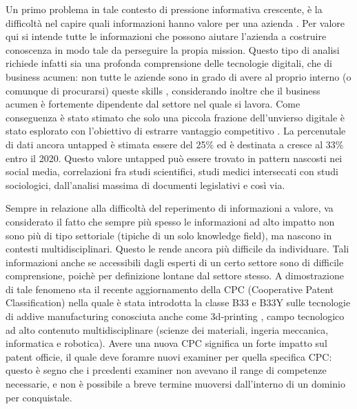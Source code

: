 \documentclass[]{book}
\begin{document}
Un primo problema in tale contesto di pressione informativa crescente, è
la difficoltà nel capire quali informazioni hanno valore per una azienda
\citep[\citet{chemchem2015data},\citet{kasemsap2015role}]{larose2014discovering}
. Per valore qui si intende tutte le informazioni che possono aiutare
l'azienda a costruire conoscenza in modo tale da perseguire la propia
mission. Questo tipo di analisi richiede infatti sia una profonda
comprensione delle tecnologie digitali, che di business acumen: non
tutte le aziende sono in grado di avere al proprio interno (o comunque
di procurarsi) queste skills \citep[\citet{davenport2012data},
\citet{provost2013data}, \citet{van2014data}]{hecklau2016holistic},
considerando inoltre che il business acumen è fortemente dipendente dal
settore nel quale si lavora. Come conseguenza è stato stimato che solo
una piccola frazione dell'unvierso digitale è stato esplorato con
l'obiettivo di estrarre vantaggio competitivo \citep{data2012bigger}. La
percenutale di dati ancora untapped è stimata essere del 25\% ed è
destinata a cresce al 33\% entro il 2020. Questo valore untapped può
essere trovato in pattern nascosti nei social media, correlazioni fra
studi scientifici, studi medici intersecati con studi sociologici,
dall'analisi massima di documenti legislativi e così via.

Sempre in relazione alla difficoltà del reperimento di informazioni a
valore, va considerato il fatto che sempre più spesso le informazioni ad
alto impatto non sono più di tipo settoriale (tipiche di un solo
knowledge field), ma nascono in contesti multidisciplinari. Questo le
rende ancora più difficile da individuare. Tali informazioni anche se
accessibili dagli esperti di un certo settore sono di difficile
comprensione, poichè per definizione lontane dal settore stesso. A
dimostrazione di tale fenomeno sta il recente aggiornamento della CPC
(Cooperative Patent Classification) nella quale è stata introdotta la
classe B33 e B33Y sulle tecnologie di addive manufacturing conosciuta
anche come 3d-printing \citep{cpc2014}, campo tecnologico ad alto
contenuto multidisciplinare (scienze dei materiali, ingeria meccanica,
informatica e robotica). Avere una nuova CPC significa un forte impatto
sul patent officie, il quale deve foramre nuovi examiner per quella
specifica CPC: questo è segno che i prcedenti examiner non avevano il
range di competenze necessarie, e non è possibile a breve termine
muoversi dall'interno di un dominio per conquistale.
\end{document}
